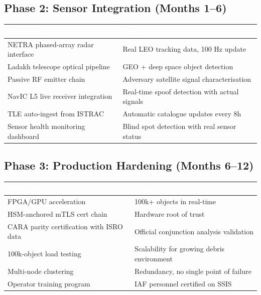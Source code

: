 \documentclass[11pt,a4paper]{article}
\newcommand{\TH}[1]{\textcolor{white}{\textbf{#1}}}
\begin{document}
\subsection{Phase 2: Sensor Integration (Months 1--6)}
\begin{table}[H]\centering\small
\begin{tabularx}{\textwidth}{|p{6cm}|X|}
\hline
\rowcolor{dblue}\TH{Deliverable} & \TH{Impact} \\
\hline
NETRA phased-array radar interface & Real LEO tracking data, 100 Hz update \\
\hline
Ladakh telescope optical pipeline & GEO + deep space object detection \\
\hline
Passive RF emitter chain & Adversary satellite signal characterisation \\
\hline
NavIC L5 live receiver integration & Real-time spoof detection with actual signals \\
\hline
TLE auto-ingest from ISTRAC & Automatic catalogue updates every 8h \\
\hline
Sensor health monitoring dashboard & Blind spot detection with real sensor status \\
\hline
\end{tabularx}
\end{table}

\subsection{Phase 3: Production Hardening (Months 6--12)}
\begin{table}[H]\centering\small
\begin{tabularx}{\textwidth}{|p{6cm}|X|}
\hline
\rowcolor{dblue}\TH{Deliverable} & \TH{Impact} \\
\hline
FPGA/GPU acceleration & 100k+ objects in real-time \\
\hline
HSM-anchored mTLS cert chain & Hardware root of trust \\
\hline
CARA parity certification with ISRO data & Official conjunction analysis validation \\
\hline
100k-object load testing & Scalability for growing debris environment \\
\hline
Multi-node clustering & Redundancy, no single point of failure \\
\hline
Operator training program & IAF personnel certified on SSIS \\
\hline
\end{tabularx}
\end{table}
\end{document}
